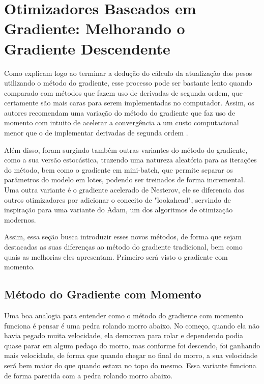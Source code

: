 
\section{Otimizadores Baseados em Gradiente: Melhorando o Gradiente Descendente}

Como \textcite{BackpropagationArticle} explicam logo ao terminar a dedução do cálculo da atualização dos pesos utilizando o método do gradiente, esse processo pode ser bastante lento quando comparado com métodos que fazem uso de derivadas de segunda ordem, que certamente são mais caras para serem implementadas no computador. Assim, os autores recomendam uma variação do método do gradiente que faz uso de momento com intuito de acelerar a convergência a um custo computacional menor que o de implementar derivadas de segunda ordem \parencite{BackpropagationArticle}.

Além disso, foram surgindo também outras variantes do método do gradiente, como a sua versão estocástica, trazendo uma natureza aleatória para as iterações do método, bem como o gradiente em mini-batch, que permite separar os parâmetros do modelo em lotes, podendo ser treinados de forma incremental. Uma outra variante é o gradiente acelerado de Nesterov, ele se diferencia dos outros otimizadores por adicionar o conceito de "lookahead", servindo de inspiração para uma variante do Adam, um dos algoritmos de otimização modernos.

Assim, essa seção busca introduzir esses novos métodos, de forma que sejam destacadas as suas diferenças ao método do gradiente tradicional, bem como quais as melhorias eles apresentam. Primeiro será visto o gradiente com momento.

\subsection{Método do Gradiente com Momento}

Uma boa analogia para entender como o método do gradiente com momento funciona é pensar é uma pedra rolando morro abaixo. No começo, quando ela não havia pegado muita velocidade, ela demorava para rolar e dependendo podia quase parar em algum pedaço do morro, mas conforme foi descendo, foi ganhando mais velocidade, de forma que quando chegar no final do morro, a sua velocidade será bem maior do que quando estava no topo do mesmo. Essa variante funciona de forma parecida com a pedra rolando morro abaixo.

